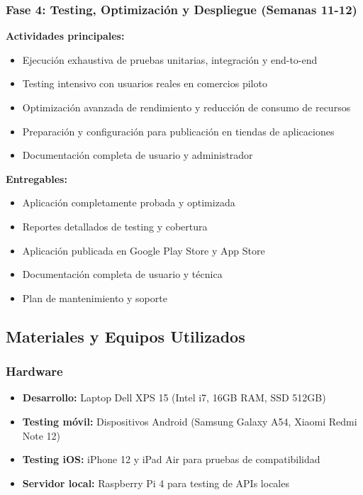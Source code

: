 \documentclass[12pt,a4paper]{report}
\begin{document}
\subsubsection{Fase 4: Testing, Optimización y Despliegue (Semanas 11-12)}
\textbf{Actividades principales:}
\begin{itemize}
	\item Ejecución exhaustiva de pruebas unitarias, integración y end-to-end
	\item Testing intensivo con usuarios reales en comercios piloto
	\item Optimización avanzada de rendimiento y reducción de consumo de recursos
	\item Preparación y configuración para publicación en tiendas de aplicaciones
	\item Documentación completa de usuario y administrador
\end{itemize}

\textbf{Entregables:}
\begin{itemize}
	\item Aplicación completamente probada y optimizada
	\item Reportes detallados de testing y cobertura
	\item Aplicación publicada en Google Play Store y App Store
	\item Documentación completa de usuario y técnica
	\item Plan de mantenimiento y soporte
\end{itemize}

\subsection{Materiales y Equipos Utilizados}

\subsubsection{Hardware}
\begin{itemize}
	\item \textbf{Desarrollo:} Laptop Dell XPS 15 (Intel i7, 16GB RAM, SSD 512GB)
	\item \textbf{Testing móvil:} Dispositivos Android (Samsung Galaxy A54, Xiaomi Redmi Note 12)
	\item \textbf{Testing iOS:} iPhone 12 y iPad Air para pruebas de compatibilidad
	\item \textbf{Servidor local:} Raspberry Pi 4 para testing de APIs locales
\end{itemize}
\end{document}
